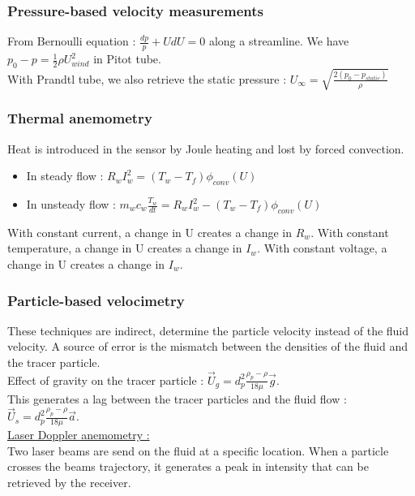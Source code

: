\documentclass[../main.tex]{subfiles}
\begin{document}
\subsubsection{Pressure-based velocity measurements}
From Bernoulli equation : $\frac{dp}{p} + UdU = 0$ along a streamline. We have $p_0-p = \frac{1}{2} \rho U_{wind}^2$ in Pitot tube.\\

With Prandtl tube, we also retrieve the static pressure : $U_{\infty} = \sqrt{\frac{2(p_0-p_{static})}{\rho}}$\\

\subsubsection{Thermal anemometry}
Heat is introduced in the sensor by Joule heating and lost by forced convection.\begin{itemize}
    \item In steady flow : $R_w I_w^2 = (T_w-T_f) \phi_{conv}(U)$\\
    \item In unsteady flow : $m_w c_w \frac{T_w}{dt} = R_w I_w^2 - (T_w-T_f) \phi_{conv}(U)$\\
\end{itemize}
With constant current, a change in U creates a change in $R_w$. With constant temperature, a change in U creates a change in $I_w$. With constant voltage, a change in U creates a change in $I_w$.\\


\subsubsection{Particle-based velocimetry}
These techniques are indirect, determine the particle velocity instead of the fluid velocity. A source of error is the mismatch between the densities of the fluid and the tracer particle.\\
Effect of gravity on the tracer particle : $\Vec{U}_g = d_p^2 \frac{\rho_p-\rho}{18\mu} \Vec{g}$.\\
This generates a lag between the tracer particles and the fluid flow : $\Vec{U}_s = d_p^2 \frac{\rho_p - \rho}{18\mu} \Vec{a}$.\\

\quad \underline{Laser Doppler anemometry :}\\
Two laser beams are send on the fluid at a specific location. When a particle crosses the beams trajectory, it generates a peak in intensity that can be retrieved by the receiver.\\
\end{document}
